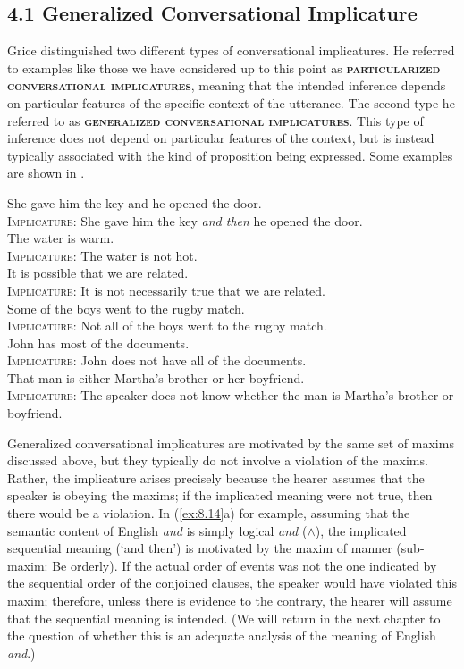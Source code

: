 \subsection{4.1 Generalized\textmd{ }Conversational Implicature}\label{sec:}

Grice distinguished two different types of conversational implicatures. He referred to examples like those we have considered up to this point as \textbf{\textsc{particularized conversational implicatures}}, meaning that the intended inference depends on particular features of the specific context of the utterance. The second type he referred to as \textbf{\textsc{generalized conversational implicatures}}. This type of inference does not depend on particular features of the context, but is instead typically associated with the kind of proposition being expressed. Some examples are shown in .


\ea \label{ex:8.14}
\ea  She gave him the key and he opened the door.\\
\textsc{Implicature}: She gave him the key \textit{and then} he opened the door.\\
\ex  The water is warm.\\
\textsc{Implicature}: The water is not hot.\\
\ex  It is possible that we are related.\\
\textsc{Implicature}: It is not necessarily true that we are related.\\
\ex  Some of the boys went to the rugby match.\\
\textsc{Implicature}: Not all of the boys went to the rugby match.\\
\ex   John has most of the documents.\\
\textsc{Implicature}: John does not have all of the documents.\\
\ex That man is either Martha’s brother or her boyfriend.\\
\textsc{Implicature}: The speaker does not know whether the man is Martha’s brother or boyfriend.\\
\z \z


Generalized conversational implicatures are motivated by the same set of maxims discussed above, but they typically do not involve a violation of the maxims. Rather, the implicature arises precisely because the hearer assumes that the speaker is obeying the maxims; if the implicated meaning were not true, then there would be a violation. In (\ref{ex:8.14}a) for example, assuming that the semantic content of English \textit{and} is simply logical \textit{and} ($\wedge$), the implicated sequential meaning (‘and then’) is motivated by the maxim of manner (sub-maxim: Be orderly). If the actual order of events was not the one indicated by the sequential order of the conjoined clauses, the speaker would have violated this maxim; therefore, unless there is evidence to the contrary, the hearer will assume that the sequential meaning is intended. (We will return in the next chapter to the question of whether this is an adequate analysis of the meaning of English \textit{and}.)




